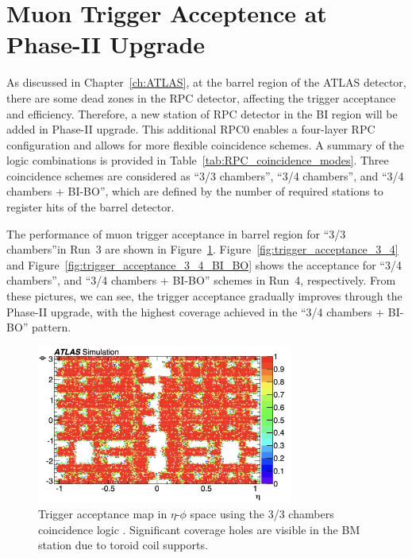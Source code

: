 \section{Muon Trigger Acceptence at Phase-II Upgrade} \label{sec:MuonTriggerAcceptance}
As discussed in Chapter~\ref{ch:ATLAS}, at the barrel region of the ATLAS detector, there are some dead zones in the RPC detector, affecting the trigger acceptance and efficiency. Therefore, a new station of RPC detector in the BI region will be added in Phase-II upgrade. This additional RPC0 enables a four-layer RPC configuration and allows for more flexible coincidence schemes. A summary of the logic combinations is provided in Table~\ref{tab:RPC_coincidence_modes}. Three coincidence schemes are considered as ``3/3 chambers'', ``3/4 chambers'', and ``3/4 chambers + BI-BO'', which are defined by the number of required stations to register hits of the barrel detector. 

The performance of muon trigger acceptance in barrel region for ``3/3 chambers''in Run~3  are shown in Figure~\ref{fig:trigger_acceptance_3_3}. Figure~\ref{fig:trigger_acceptance_3_4} and Figure~\ref{fig:trigger_acceptance_3_4_BI_BO} shows the acceptance for ``3/4 chambers'', and ``3/4 chambers + BI-BO'' schemes in Run~4, respectively. From these pictures, we can see, the trigger acceptance gradually improves through the Phase-II upgrade, with the highest coverage achieved in the “3/4 chambers + BI-BO” pattern.



\begin{figure}[htbp]
  \centering
  \includegraphics[width=0.75\textwidth]{figs/chapter4/trigger_acceptance_map_3_3.png}
  \caption{Trigger acceptance map in $\eta$-$\phi$ space using the 3/3 chambers coincidence logic \cite{TDAQ_TDR}. Significant coverage holes are visible in the BM station due to toroid coil supports.}
  \label{fig:trigger_acceptance_3_3}
\end{figure}

